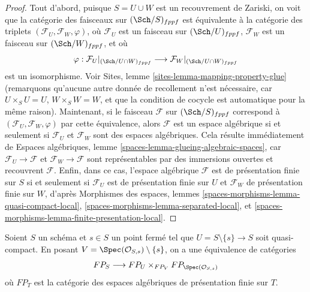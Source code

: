 \begin{proof}
Tout d'abord, puisque $S = U \cup W$ est un recouvrement de Zariski, on voit que la
catégorie des faisceaux sur $(\Sch/S)_{fppf}$ est équivalente à la catégorie
des triplets $(\mathcal{F}_U, \mathcal{F}_W, \varphi)$, où
$\mathcal{F}_U$ est un faisceau sur $(\Sch/U)_{fppf}$,
$\mathcal{F}_W$ est un faisceau sur $(\Sch/W)_{fppf}$, et où
$$
\varphi :
\mathcal{F}_U|_{(\Sch/U \cap W)_{fppf}}
\longrightarrow
\mathcal{F}_W|_{(\Sch/U \cap W)_{fppf}}
$$
est un isomorphisme. Voir Sites, lemme \ref{sites-lemma-mapping-property-glue}
(remarquons qu'aucune autre donnée de recollement n'est nécessaire, car
$U \times_S U = U$, $W \times_S W = W$, et que la condition de cocycle
est automatique pour la même raison).
Maintenant, si le faisceau $\mathcal{F}$ sur $(\Sch/S)_{fppf}$
correspond à $(\mathcal{F}_U, \mathcal{F}_W, \varphi)$
par cette équivalence, alors $\mathcal{F}$ est un espace algébrique
si et seulement si $\mathcal{F}_U$ et $\mathcal{F}_W$ sont des espaces algébriques.
Cela résulte immédiatement de
Espaces algébriques, lemme \ref{spaces-lemma-glueing-algebraic-spaces},
car $\mathcal{F}_U \to \mathcal{F}$ et $\mathcal{F}_W \to \mathcal{F}$
sont représentables par des immersions ouvertes et recouvrent $\mathcal{F}$.
Enfin, dans ce cas, l'espace algébrique $\mathcal{F}$ est de
présentation finie sur $S$ si et seulement si $\mathcal{F}_U$ est de présentation finie
sur $U$ et $\mathcal{F}_W$ de présentation finie sur $W$,
d'après Morphismes des espaces, lemmes
\ref{spaces-morphisms-lemma-quasi-compact-local},
\ref{spaces-morphisms-lemma-separated-local}, et
\ref{spaces-morphisms-lemma-finite-presentation-local}.
\end{proof}

\begin{lemma}
\label{lemma-glueing-near-closed-point}
Soient $S$ un schéma et $s \in S$ un point fermé tel que
$U = S \setminus \{s\} \to S$ soit quasi-compact. En posant
$V = \Spec(\mathcal{O}_{S, s}) \setminus \{s\}$, on a
une équivalence de catégories
$$
FP_S \longrightarrow FP_U \times_{FP_V} FP_{\Spec(\mathcal{O}_{S, s})}
$$
où $FP_T$ est la catégorie des espaces algébriques de présentation finie
sur $T$.
\end{lemma}

